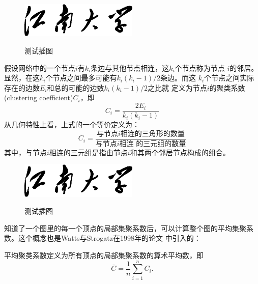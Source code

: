 \documentclass[phd]{jnuthesis}
\begin{document}
\begin{definition}[局部聚类系数]


\begin{figure}[htbp]
  \centering
  \includegraphics[width= 0.5\textwidth]{jnuname.eps}\\
  \caption{测试插图}\label{fig:test5}
\end{figure}

假设网络中的一个节点$i$有$k_i$条边与其他节点相连，这$k_i$个节点称为节点
$i$的邻居。显然，在这$k_i$个节点之间最多可能有$k_i(k_i-1)/2$条边。而这
$k_i$个节点之间实际存在的边数$E_i$和总的可能的边数$k_i(k_i-1)/2$之比就
定义为节点$i$的聚类系数(clustering coefficient)$C_i$，即
\begin{equation}\label{eq:clustering_coefficient}
    C_i = \frac{2E_i}{k_i(k_i-1)}
\end{equation}
从几何特性上看，上式的一个等价定义为：
\begin{equation}\label{eq:clustering_coefficient_triangle}
    C_i = \frac{\text{与节点$i$相连的三角形的数量}}{\text{与节点$i$相连
        的三元组的数量}}
\end{equation}
其中，与节点$i$相连的三元组是指由节点$i$和其两个邻居节点构成的组合。
\end{definition}

\begin{figure}[htbp]
  \centering
  \includegraphics[width= 0.5\textwidth]{jnuname.eps}\\
  \caption{测试插图}\label{fig:test6}
\end{figure}

知道了一个图里的每一个顶点的局部集聚系数后，可以计算整个图的平均集聚系
数。这个概念也是Watts与Strogatz在1998年的论文
\cite{watts1998smallworld}中引入的：

\begin{definition}[平均聚类系数]
平均聚类系数定义为所有顶点的局部集聚系数的算术平均数，即
\begin{equation}
    \bar{C} = \frac{1}{n}\sum_{i=1}^{n} C_i.
\end{equation}
\end{definition}
\end{document}
